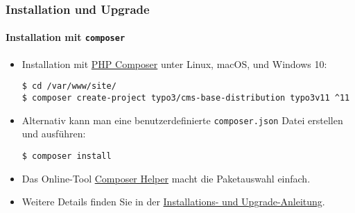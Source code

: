 %

\begin{frame}[fragile]
	\frametitle{Installation und Upgrade}
	\framesubtitle{Installation mit \texttt{composer}}


	\begin{itemize}
		\item Installation mit \href{https://getcomposer.org}{PHP Composer} unter Linux, macOS, und Windows 10:
\begin{lstlisting}
$ cd /var/www/site/
$ composer create-project typo3/cms-base-distribution typo3v11 ^11
\end{lstlisting}

		\item Alternativ kann man eine benutzerdefinierte \texttt{composer.json} Datei erstellen und ausführen:
\begin{lstlisting}
$ composer install
\end{lstlisting}

		\item Das Online-Tool \href{https://get.typo3.org/misc/composer/helper}{Composer Helper}
			macht die Paketauswahl einfach.

		\item Weitere Details finden Sie in der
			\href{https://docs.typo3.org/m/typo3/guide-installation/master/en-us/}{Installations- und Upgrade-Anleitung}.

	\end{itemize}
\end{frame}

